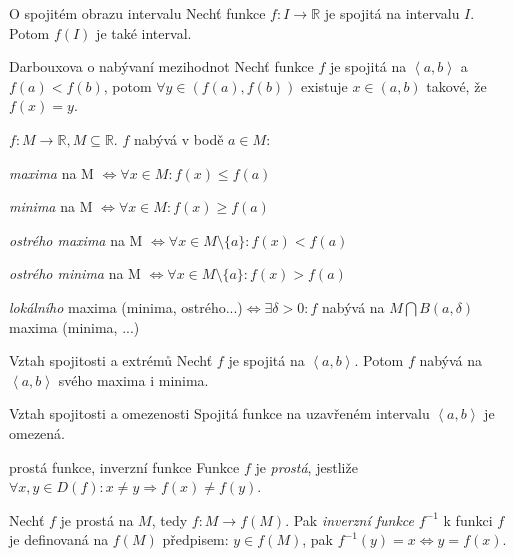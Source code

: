 \begin{vetaN}{O spojitém obrazu intervalu}
Nechť funkce $f: I \rightarrow \mathbb{R}$ je spojitá na intervalu $I$. Potom $f(I)$ je také interval.
\end{vetaN}

\begin{vetaN}{Darbouxova o nabývaní mezihodnot}
Nechť funkce $f$ je spojitá na $\left<a, b\right>$ a $f(a)<f(b)$, potom $\forall y \in (f(a), f(b))$ existuje $x \in (a, b)$ takové, že $f(x)=y$.
\end{vetaN}

\begin{definice}
$f: M \rightarrow \mathbb{R}, M \subseteq \mathbb{R}$. $f$ nabývá v bodě $a \in M$:
\begin{pitemize}
	\item \emph{maxima} na M $\Leftrightarrow \forall x \in M: f(x) \le f(a)$
	\item \emph{minima} na M $\Leftrightarrow \forall x \in M: f(x) \ge f(a)$
	\item \emph{ostrého maxima} na M $\Leftrightarrow \forall x \in M\setminus \{a\}: f(x) < f(a)$
	\item \emph{ostrého minima} na M $\Leftrightarrow \forall x \in M\setminus \{a\}: f(x) > f(a)$
	\item \emph{lokálního} maxima (minima, ostrého...)$\Leftrightarrow \exists \delta > 0: f$ nabývá na $M \bigcap B(a, \delta)$ maxima (minima, ...)
\end{pitemize}
\end{definice}

\begin{vetaN}{Vztah spojitosti a extrémů}
Nechť $f$ je spojitá na $\left<a, b\right>$. Potom $f$ nabývá na $\left<a, b\right>$ svého maxima i minima.
\end{vetaN}

\begin{vetaN}{Vztah spojitosti a omezenosti}
Spojitá funkce na uzavřeném intervalu $\left<a, b\right>$ je omezená.
\end{vetaN}

\begin{definiceN}{prostá funkce, inverzní funkce}
Funkce $f$ je \emph{prostá}, jestliže $\forall x, y \in D(f): x \neq y \Rightarrow f(x) \neq f(y)$.

Nechť $f$ je prostá na $M$, tedy $f: M \rightarrow f(M)$. Pak \emph{inverzní funkce} $f^{-1}$ k funkci $f$ je definovaná na $f(M)$ předpisem: $y \in f(M)$, pak $f^{-1}(y)=x \Leftrightarrow y=f(x)$.
\end{definiceN}

